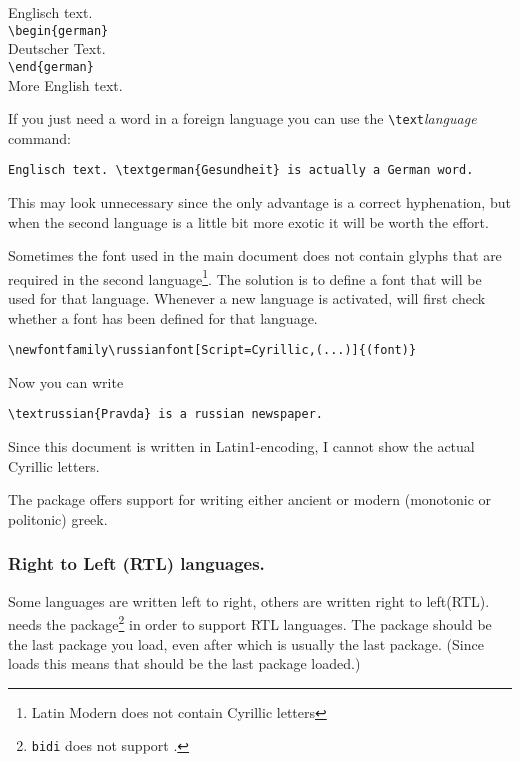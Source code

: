 \begin{lscommand}
Englisch text.\\
\verb|\begin{german}|\\
Deutscher Text.\\
\verb|\end{german}|\\
More English text.
\end{lscommand}

If you just need a word in a foreign language you can use the
\verb|\text|\emph{language} command:

\begin{lscommand}
\verb|Englisch text. \textgerman{Gesundheit} is actually a German word.|
\end{lscommand}

This may look unnecessary since the only advantage is a correct hyphenation,
but when the second language is a little bit more exotic it will be worth
the effort.

Sometimes the font used in the main document does not contain glyphs that
are required in the second language\footnote{Latin Modern does not contain
Cyrillic letters}. The solution is to define a font that will be used for
that language. Whenever a new language is activated,  will
first check whether a font has been defined for that language.

\begin{lscommand}
\verb|\newfontfamily\russianfont[Script=Cyrillic,(...)]{(font)}|
\end{lscommand}

Now you can write

\begin{lscommand} \verb|\textrussian{Pravda} is a russian newspaper.|
\end{lscommand}
%
Since this document is written in Latin1-encoding, I cannot show the actual
Cyrillic letters.

The package \cite{xgreek} offers support for
writing either ancient or modern (monotonic or politonic) greek.

\subsubsection{Right to Left (RTL) languages.}

Some languages are written left to right, others are written right to
left(RTL).  needs the \cite{bidi}
package\footnote{\texttt{bidi} does not support .} in order
to support RTL languages. The  package should be the last package
you load, even after  which is usually the last package.
(Since  loads  this means that 
should be the last package loaded.)

